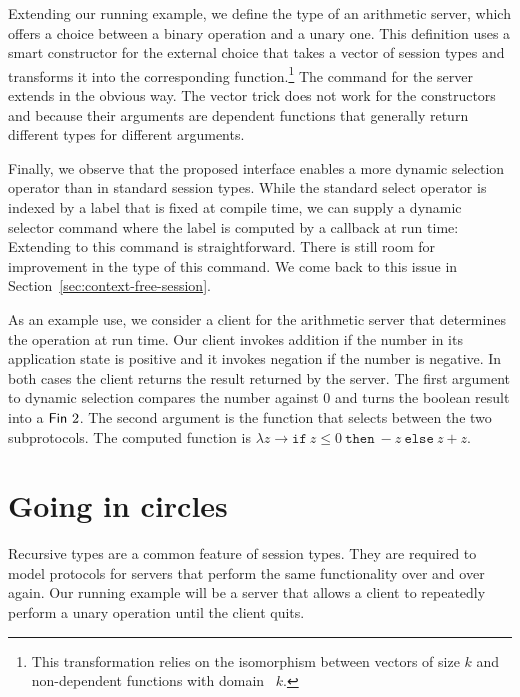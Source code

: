 \documentclass[acmsmall,review,anonymous,screen]{acmart}
\begin{document}
Extending our running example, we define the type of an arithmetic server,
which offers a choice between a binary operation and a unary one. 
This definition uses a smart constructor {\Aamp} for the external choice that
takes a vector of session types and transforms it into the
corresponding function.\footnote{This transformation relies on the
  isomorphism between vectors of size $k$ and non-dependent functions with domain {\AFin~$k$}.}
\stExampleArithP
The command for the server extends in the obvious way. The vector
trick does not work for the {\ACommand} constructors {\ACSELECT} and
{\ACCHOICE} because their arguments are dependent functions that
generally return different types for different arguments.
\stArithpCommand

Finally, we observe that the proposed interface enables a more dynamic
selection operator than in standard session types. While the standard
select operator is indexed by a label that is fixed at compile time,
we can supply a dynamic selector command where the label is computed
by a callback  at run time:
\stDynamicBranchingCommand
Extending {\Aexecutor} to this command is straightforward.
There is still room for improvement in the type of this command. We
come back to this issue in Section~\ref{sec:context-free-session}.

As an example use, we consider a client for the arithmetic server that
determines the operation at run time. Our client invokes addition if
the number in its application state is positive and it invokes
negation if the number is negative. In both cases the client returns
the result returned by the server.
\stArithpClient
The first argument to dynamic selection compares the number against
$0$ and turns the boolean result into a $\AFin~2$. The second argument
is the function that selects between the two subprotocols. The
computed function is $\lambda z \to \mathtt{if}\ z\le0\ \mathtt{then}\
-z\ \mathtt{else}\ z+z$. 

\section{Going in circles}
\label{sec:going-circles}


Recursive types are a common feature of session types. They are required
to model protocols for servers that perform the same functionality
over and over again. Our running example will be a server that allows
a client to repeatedly perform a unary operation until the client
quits.
\end{document}
